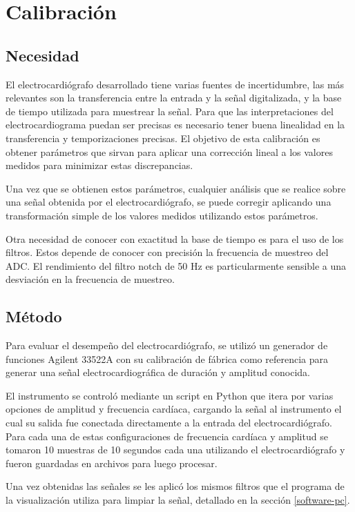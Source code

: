 \documentclass[conference]{IEEEtran}
\begin{document}
\section{Calibración}


\subsection{Necesidad}

El electrocardiógrafo desarrollado tiene varias fuentes de incertidumbre, las más
relevantes son la transferencia entre la entrada y la señal digitalizada, y la base
de tiempo utilizada para muestrear la señal. Para que las interpretaciones del
electrocardiograma puedan ser precisas es necesario tener buena linealidad en la 
transferencia y temporizaciones precisas. El objetivo de esta calibración es
obtener parámetros que sirvan para aplicar una corrección lineal a los valores
medidos para minimizar estas discrepancias.

Una vez que se obtienen estos parámetros, cualquier análisis que se realice sobre
una señal obtenida por el electrocardiógrafo, se puede corregir aplicando una
transformación simple de los valores medidos utilizando estos parámetros.

Otra necesidad de conocer con exactitud la base de tiempo es para el uso de los
filtros. Estos depende de conocer con precisión la frecuencia de muestreo del ADC.
El rendimiento del filtro notch de 50 Hz es particularmente sensible a una
desviación en la frecuencia de muestreo.


\subsection{Método}


Para evaluar el desempeño del electrocardiógrafo, se utilizó un generador de funciones
Agilent 33522A con su calibración de fábrica como referencia para generar una señal
electrocardiográfica de duración y amplitud conocida.

El instrumento se controló mediante un script en Python que itera por varias
opciones de amplitud y frecuencia cardíaca, cargando la señal al instrumento el cual 
su salida fue conectada directamente a la entrada del electrocardiógrafo. Para cada 
una de estas configuraciones de frecuencia cardíaca y amplitud se tomaron 10
muestras de 10 segundos cada una utilizando el electrocardiógrafo y fueron guardadas
en archivos para luego procesar.

Una vez obtenidas las señales se les aplicó los mismos filtros que el programa de
la visualización utiliza para limpiar la señal, detallado en la sección
\ref{software-pc}.
\end{document}
